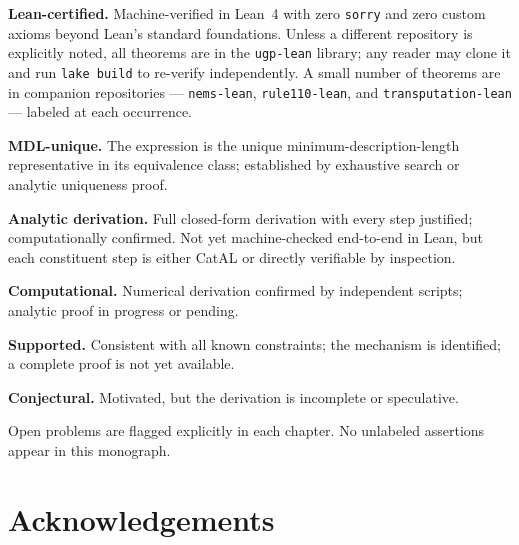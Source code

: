 \documentclass[11pt,openany]{book}
\theoremstyle{remark}
\newcommand{\lean}[1]{%
  \penalty-100
  \begingroup\def\_{\textunderscore\allowbreak}\texttt{#1}\endgroup}
\newcommand{\CatA}{\textbf{A}}
\newcommand{\CatAL}{\ensuremath{\textbf{A}_{\rm Lean}}}
\newcommand{\CatAMDL}{\ensuremath{\textbf{A}_{\rm MDL}}}
\newcommand{\CatAD}{\textbf{A/D}}
\newcommand{\CatB}{\textbf{B}}
\newcommand{\CatD}{\textbf{D}}
\begin{document}
\begin{tcolorbox}[colback=orange!5,colframe=orange!60,title={Claim-Strength Taxonomy},breakable]
\begin{description}[leftmargin=2.2cm,labelwidth=2cm,font=\bfseries]
\item[$\CatAL$] \textbf{Lean-certified.} Machine-verified in Lean~4 with zero \lean{sorry}
  and zero custom axioms beyond Lean's standard foundations. Unless a different repository
  is explicitly noted, all theorems are in the \lean{ugp-lean} library; any reader may
  clone it and run \lean{lake build} to re-verify independently. A small number of
  theorems are in companion repositories --- \lean{nems-lean}, \lean{rule110-lean},
  and \lean{transputation-lean} --- labeled at each occurrence.
\item[$\CatAMDL$] \textbf{MDL-unique.} The expression is the unique minimum-description-length
  representative in its equivalence class; established by exhaustive search or
  analytic uniqueness proof.
\item[$\CatAD$] \textbf{Analytic derivation.} Full closed-form derivation with every
  step justified; computationally confirmed. Not yet machine-checked end-to-end in Lean,
  but each constituent step is either CatAL or directly verifiable by inspection.
\item[$\CatA$] \textbf{Computational.} Numerical derivation confirmed by independent
  scripts; analytic proof in progress or pending.
\item[$\CatB$] \textbf{Supported.} Consistent with all known constraints; the
  mechanism is identified; a complete proof is not yet available.
\item[$\CatD$] \textbf{Conjectural.} Motivated, but the derivation is incomplete
  or speculative.
\end{description}
Open problems are flagged explicitly in each chapter. No unlabeled assertions appear
in this monograph.
\end{tcolorbox}

\tableofcontents

\mainmatter

\chapter*{Acknowledgements}
\label{chap:acknowledgements}
\end{document}
